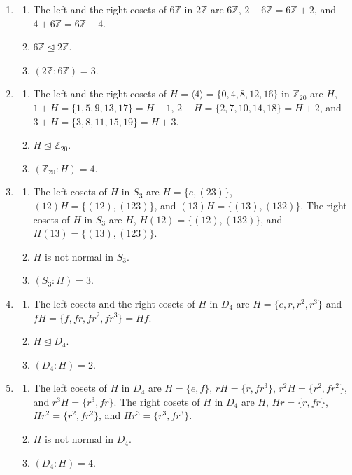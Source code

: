 \documentclass[10pt,]{book}
\theoremstyle{plain}
\theoremstyle{definition}
\theoremstyle{definition}
\theoremstyle{definition}
\theoremstyle{definition}
\numberwithin{equation}{section}
\def\Z{\mathbb{Z}}
\begin{document}
\begin{enumerate}[label=(\alph*)]
\item\hypertarget{li-428}{}%
\begin{enumerate}[label=\roman*.]
\item\hypertarget{li-429}{}The left and the right cosets of \(6\Z\) in \(2\Z\) are \(6\Z\), \(2+6\Z=6\Z+2\), and \(4+6\Z=6\Z+4\).%
\item\hypertarget{li-430}{}\(6\Z \unlhd 2\Z\).%
\item\hypertarget{li-431}{}\((2\Z:6\Z)=3\).%
\end{enumerate}
%
\item\hypertarget{li-432}{}%
\begin{enumerate}[label=\roman*.]
\item\hypertarget{li-433}{}The left and the right cosets of \(H=\langle 4\rangle =\{0,4,8,12,16\}\) in \(\Z_{20}\) are \(H\), \(1+H=\{1,5,9,13,17\}=H+1\), \(2+H=\{2,7,10,14,18\}=H+2\), and \(3+H=\{3,8,11,15,19\}=H+3\).%
\item\hypertarget{li-434}{}\(H \unlhd \Z_{20}\).%
\item\hypertarget{li-435}{}\((\Z_{20}:H)=4\).%
\end{enumerate}
%
\item\hypertarget{li-436}{}%
\begin{enumerate}[label=\roman*.]
\item\hypertarget{li-437}{}The left cosets of \(H\) in \(S_3\) are \(H=\{e,(23)\}\), \((12)H=\{(12),(123)\}\), and \((13)H=\{(13),(132)\}\). The right cosets of \(H\) in \(S_3\) are \(H\), \(H(12)=\{(12),(132)\}\), and \(H(13)=\{(13),(123)\}\).%
\item\hypertarget{li-438}{}\(H\) is not normal in \(S_3\).%
\item\hypertarget{li-439}{}\((S_3:H)=3\).%
\end{enumerate}
%
\item\hypertarget{li-440}{}%
\begin{enumerate}[label=\roman*.]
\item\hypertarget{li-441}{}The left cosets and the right cosets of \(H\) in \(D_4\) are \(H=\{e,r,r^2,r^3\}\) and \(fH=\{f,fr, fr^2, fr^3\}=Hf\).%
\item\hypertarget{li-442}{}\(H\unlhd D_4\).%
\item\hypertarget{li-443}{}\((D_4:H)=2\).%
\end{enumerate}
%
\item\hypertarget{li-444}{}%
\begin{enumerate}[label=\roman*.]
\item\hypertarget{li-445}{}The left cosets of \(H\) in \(D_4\) are \(H=\{e,f\}\), \(rH=\{r,fr^3\}\), \(r^2H=\{r^2,fr^2\}\), and \(r^3H=\{r^3, fr\}\). The right cosets of \(H\) in \(D_4\) are \(H\), \(Hr=\{r, fr\}\), \(Hr^2=\{r^2,fr^2\}\), and \(Hr^3=\{r^3, fr^3\}\).%
\item\hypertarget{li-446}{}\(H\) is not normal in \(D_4\).%
\item\hypertarget{li-447}{}\((D_4:H)=4\).%
\end{enumerate}
%
\end{enumerate}
\end{document}
